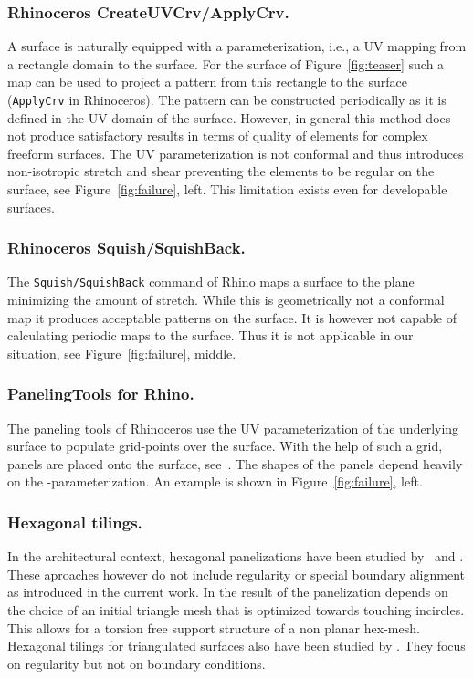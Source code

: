 \documentclass[article.tex]{subfiles}
\begin{document}
\subsubsection{Rhinoceros CreateUVCrv/ApplyCrv.}
A \nurbs surface is naturally equipped with a parameterization, i.e.,
a UV mapping from a rectangle domain to the surface. For the surface
of Figure~\ref{fig:teaser} such a map can be used to project a pattern
from this rectangle to the surface ({\tt ApplyCrv} in Rhinoceros). The
pattern can be constructed periodically as it is defined in the UV
domain of the surface. However, in general this method does not
produce satisfactory results in terms of quality of elements for
complex freeform surfaces. The UV parameterization is not conformal
and thus introduces non-isotropic stretch and shear preventing the
elements to be regular on the surface, see Figure~\ref{fig:failure},
left. This limitation exists even for developable surfaces.

\subsubsection{Rhinoceros Squish/SquishBack.}
The {\tt Squish/SquishBack} command of Rhino maps a surface to the
plane minimizing the amount of stretch. While this is geometrically
not a conformal map it produces acceptable patterns on the surface. It
is however not capable of calculating periodic maps to the surface.
Thus it is not applicable in our situation, see
Figure~\ref{fig:failure}, middle.

\subsubsection{PanelingTools for Rhino.}
The paneling tools of Rhinoceros use the UV parameterization of the
underlying surface to populate grid-points over the surface. With the
help of such a grid, panels are placed onto the surface,
see~\cite{panelingtools}. The shapes of the panels depend heavily on
the \nurbs-parameterization. An example is shown in
Figure~\ref{fig:failure}, left.

\subsubsection{Hexagonal tilings.}
In the architectural context, hexagonal panelizations have been
studied by~\cite{TangentPlanes, Troche} and \cite{SHWP09}. These
aproaches however do not include regularity or special boundary
alignment as introduced in the current work.  In \cite{SHWP09} the
result of the panelization depends on the choice of an initial
triangle mesh that is optimized towards touching incircles. This
allows for a torsion free support structure of a non planar
hex-mesh. Hexagonal tilings for triangulated surfaces also have been
studied by \cite{NieserPPZ12}. They focus on regularity but not on
boundary conditions.
\end{document}
